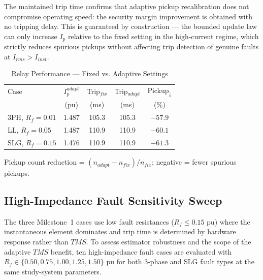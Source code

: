 \documentclass[journal, twoside, 10pt]{IEEEtran}
\newcommand{\pu}{\,\text{pu}}
\begin{document}
The maintained trip time confirms that adaptive pickup recalibration does not
compromise operating speed: the security margin improvement is obtained with
no tripping delay.  This is guaranteed by construction --- the bounded update
law can only increase $I_p$ relative to the fixed setting in the high-current
regime, which strictly reduces spurious pickups without affecting trip detection
of genuine faults at $I_{rms} > I_{inst}$.

\begin{table}[!t]
\caption{Relay Performance — Fixed vs. Adaptive Settings}
\label{tab:protection}
\centering
\renewcommand{\arraystretch}{1.15}
\begin{tabular}{@{}lcccc@{}}
\toprule
Case & $I_p^{adapt}$ & Trip$_{fix}$ & Trip$_{adapt}$ & Pickup$_\downarrow$ \\
     & (pu)          & (ms)         & (ms)            & (\%)    \\
\midrule
3PH, $R_f\!=\!0.01$  & 1.487 & 105.3 & 105.3 & $-57.9$ \\
LL,  $R_f\!=\!0.05$  & 1.487 & 110.9 & 110.9 & $-60.1$ \\
SLG, $R_f\!=\!0.15$  & 1.476 & 110.9 & 110.9 & $-61.3$ \\
\bottomrule
\end{tabular}
\vspace{2pt}
{\scriptsize Pickup count reduction = $(n_{adapt}-n_{fix})/n_{fix}$;
negative = fewer spurious pickups.}
\end{table}

\subsection{High-Impedance Fault Sensitivity Sweep}
\label{sec:hif}

The three Milestone~1 cases use low fault resistances ($R_f \leq 0.15\,\pu$)
where the instantaneous element dominates and trip time is determined by
hardware response rather than $TMS$.  To assess estimator robustness and the
scope of the adaptive $TMS$ benefit, ten high-impedance fault cases are
evaluated with $R_f \in \{0.50, 0.75, 1.00, 1.25, 1.50\}\,\pu$ for both
3-phase and SLG fault types at the same study-system parameters.
\end{document}
